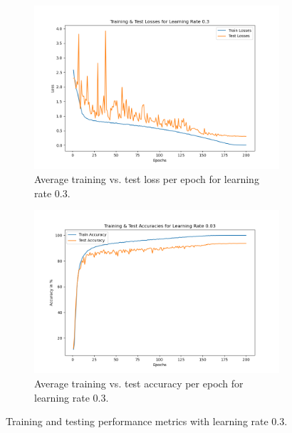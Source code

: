 \begin{figure}[H]
    \centering
    \begin{subfigure}[t]{0.48\textwidth}
        \centering
        \includegraphics[width=\textwidth]{assignment_1/report/images/ex_2_losses_03.png}
        \caption{Average training vs. test loss per epoch for learning rate 0.3.}
    \end{subfigure}
    \hfill
    \begin{subfigure}[t]{0.48\textwidth}
        \centering
        \includegraphics[width=\textwidth]{assignment_1/report/images/ex_2_accuracies_003.png}
        \caption{Average training vs. test accuracy per epoch for learning rate 0.3.}
    \end{subfigure}
    \caption{Training and testing performance metrics with learning rate 0.3.}
\end{figure}

